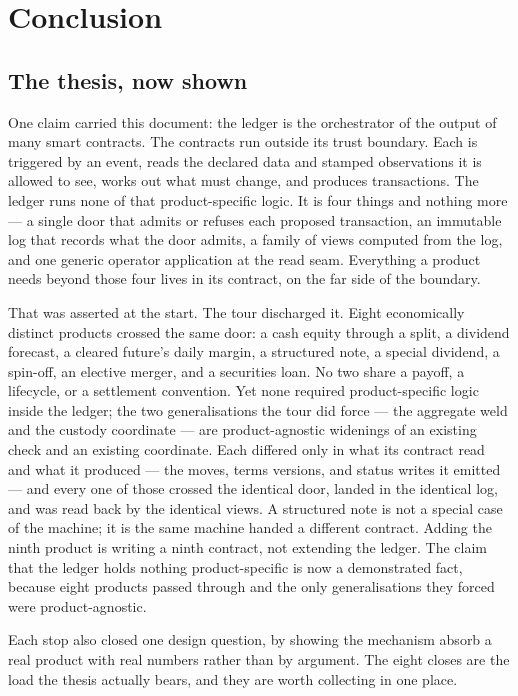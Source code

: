 \section{Conclusion}\label{sec:conclusion}

\subsection{The thesis, now shown}

One claim carried this document: the ledger is the orchestrator of the output of
many smart contracts. The contracts run outside its trust boundary. Each is
triggered by an event, reads the declared data and stamped observations it is
allowed to see, works out what must change, and produces transactions. The ledger
runs none of that product-specific logic. It is four things and nothing more --- a
single door that admits or refuses each proposed transaction, an immutable log that
records what the door admits, a family of views computed from the log, and one
generic operator application at the read seam. Everything a product needs beyond
those four lives in its contract, on the far side of the boundary.

That was asserted at the start. The tour discharged it. Eight economically distinct
products crossed the same door: a cash equity through a split, a dividend forecast,
a cleared future's daily margin, a structured note, a special dividend, a spin-off,
an elective merger, and a securities loan. No two share a payoff, a lifecycle, or a
settlement convention. Yet none required product-specific logic inside the ledger;
the two generalisations the tour did force --- the aggregate weld and the custody
coordinate --- are product-agnostic widenings of an existing check and an existing
coordinate. Each differed only in what its contract read and what it
produced --- the moves, terms versions, and status writes it emitted --- and every
one of those crossed the identical door, landed in the identical log, and was read
back by the identical views. A structured note is not a special case of the machine;
it is the same machine handed a different contract. Adding the ninth product is
writing a ninth contract, not extending the ledger. The claim that the ledger holds
nothing product-specific is now a demonstrated fact, because eight products passed
through and the only generalisations they forced were product-agnostic.

Each stop also closed one design question, by showing the mechanism absorb a real
product with real numbers rather than by argument. The eight closes are the load the
thesis actually bears, and they are worth collecting in one place.

